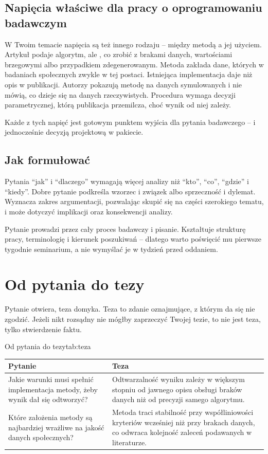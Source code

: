 \subsection{Napięcia właściwe dla pracy o oprogramowaniu badawczym}

W Twoim temacie napięcia są też innego rodzaju -- między metodą a jej użyciem. Artykuł podaje algorytm, ale , co zrobić z brakami danych, wartościami brzegowymi albo przypadkiem zdegenerowanym. Metoda zakłada dane, których w badaniach społecznych zwykle  w tej postaci. Istniejąca implementacja daje  niż opis w publikacji. Autorzy pokazują metodę na danych symulowanych i nie mówią, co dzieje się na danych rzeczywistych. Procedura wymaga decyzji parametrycznej, którą publikacja przemilcza, choć wynik od niej zależy.

Każde z tych napięć jest gotowym punktem wyjścia dla pytania badawczego -- i jednocześnie decyzją projektową w pakiecie.

\subsection{Jak formułować}

Pytania \enquote{jak} i \enquote{dlaczego} wymagają więcej analizy niż \enquote{kto}, \enquote{co}, \enquote{gdzie} i \enquote{kiedy}. Dobre pytanie podkreśla wzorzec i związek albo sprzeczność i dylemat. Wyznacza zakres argumentacji, pozwalając skupić się na części szerokiego tematu, i może dotyczyć implikacji oraz konsekwencji analizy.

Pytanie prowadzi przez cały proces badawczy i pisanie. Kształtuje strukturę pracy, terminologię i kierunek poszukiwań -- dlatego warto poświęcić mu pierwsze tygodnie seminarium, a nie wymyślać je w tydzień przed oddaniem.

\section{Od pytania do tezy}

Pytanie otwiera, teza domyka. Teza to zdanie oznajmujące, z którym da się nie zgodzić. Jeżeli nikt rozsądny nie mógłby zaprzeczyć Twojej tezie, to nie jest teza, tylko stwierdzenie faktu.

\begin{tabelaepi}{Od pytania do tezy}{tab:teza}
\begin{tabular}{@{}p{5.2cm}p{8cm}@{}}
\toprule
Pytanie & Teza \\
\midrule
Jakie warunki musi spełnić implementacja metody, żeby wynik dał się odtworzyć? & Odtwarzalność wyniku zależy w większym stopniu od jawnego opisu obsługi braków danych niż od precyzji samego algorytmu. \\
Które założenia metody są najbardziej wrażliwe na jakość danych społecznych? & Metoda traci stabilność przy współliniowości kryteriów wcześniej niż przy brakach danych, co odwraca kolejność zaleceń podawanych w literaturze. \\
\bottomrule
\end{tabular}
\end{tabelaepi}

